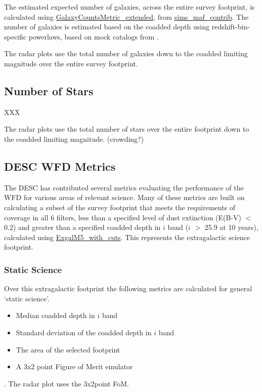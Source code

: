 The estimated expected number of galaxies, across the entire survey footprint, is calculated using \href{https://github.com/LSST-nonproject/sims_maf_contrib/blob/master/mafContrib/LSSObsStrategy/galaxyCountsMetric_extended.py#L26}{GalaxyCountsMetric\_extended}, from \href{https://github.com/LSST-nonproject/sims_maf_contrib}{sims\_maf\_contrib}. The number of galaxies is estimated based on the coadded depth using redshift-bin-specific powerlaws, based on mock catalogs from \citet{2003MNRAS.343..796P}. 

The radar plots use the total number of galaxies down to the coadded limiting magnitude over the entire survey footprint.

\subsection{Number of Stars}

XXX

The radar plots use the total number of stars over the entire footprint down to the coadded limiting magnitude. (crowding?)

\subsection{DESC WFD Metrics}

The DESC has contributed several metrics evaluating the performance of the WFD for various areas of relevant science. Many of these metrics are built on calculating a subset of the survey footprint that meets the requirements of coverage in all 6 filters, less than a specified level of dust extinction (E(B-V) $<$ 0.2) and greater than a specified coadded depth in $i$ band ($i$ $>$ 25.9 at 10 years), calculated using \href{https://github.com/lsst/sims_maf/blob/master/python/lsst/sims/maf/metrics/weakLensingSystematicsMetric.py#L8}{ExgalM5\_with\_cuts}. This represents the extragalactic science footprint. 

\subsubsection{Static Science}
Over this extragalactic footprint the following metrics are calculated for general `static science'.
\begin{itemize}
\item Median coadded depth in $i$ band
\item Standard deviation of the coadded depth in $i$ band
\item The area of the selected footprint
\item A 3x2 point Figure of Merit emulator
\end{itemize}. 
The radar plot uses the 3x2point FoM. 

